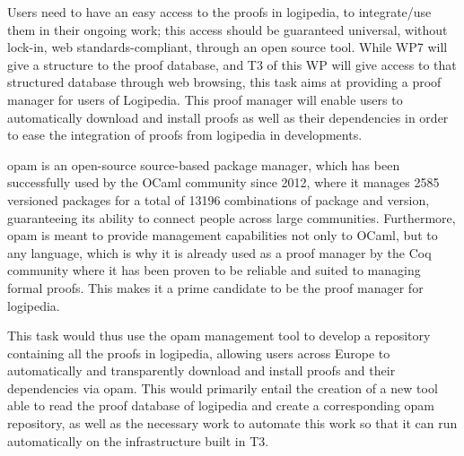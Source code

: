 \begin{workpackage}[id=access,wphases=0-48,type=MGT,
  short=Access,%
  title={Access to the infrastructure},
  lead=Inr,
  InrRM=28,
  OcaRM=6]
\begin{tasklist}
\begin{task}[id=web,title=Giving access to the infrastructure on the world-wide web,lead=Irt]
\end{task}

  \begin{task}[id=opam,title=Giving access to the infrastructure in proof tools]
    Users need to have an easy access to the proofs in logipedia, to integrate/use
    them in their ongoing work; this access should be guaranteed universal, without
    lock-in, web standards-compliant, through an open source tool. While WP7
    will give a structure to the proof database, and T3 of this WP will give access
    to that structured database through web browsing, this task aims at
    providing a proof manager for users of Logipedia. This proof manager
    will enable users to automatically download and install proofs as well as their
    dependencies in order to ease the integration of proofs from logipedia in
    developments.

    opam \cite{opam} is an open-source source-based package manager, which has
    been successfully used by the OCaml community since 2012, where it manages
    2585 versioned packages for a total of 13196 combinations of package and
    version, guaranteeing its ability to connect people across large communities.
    Furthermore, opam is meant to provide management capabilities not only to
    OCaml, but to any language, which is why it is already used as a proof
    manager by the Coq community where it has been proven to be reliable and
    suited to managing formal proofs. This makes it a prime candidate to be the
    proof manager for logipedia.

    This task would thus use the opam management tool to develop a repository
    containing all the proofs in logipedia, allowing users across Europe to
    automatically and transparently download and install proofs and their
    dependencies via opam. This would primarily entail the creation of a new
    tool able to read the proof database of logipedia and create a corresponding
    opam repository, as well as the necessary work to automate this work so that
    it can run automatically on the infrastructure built in T3.

  \end{task}


\end{tasklist}
\end{workpackage}

